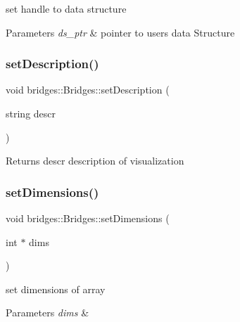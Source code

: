 set handle to data structure


\begin{DoxyParams}{Parameters}
{\em ds\+\_\+ptr} & pointer to user\textquotesingle{}s data Structure \\
\hline
\end{DoxyParams}
\mbox{\label{namespacebridges_1_1_bridges_ada1bced1a3d7af3b8b139bbdfba72fc8}} 
\subsubsection{\texorpdfstring{set\+Description()}{setDescription()}}
{\footnotesize\ttfamily void bridges\+::\+Bridges\+::set\+Description (\begin{DoxyParamCaption}\item[{string}]{descr }\end{DoxyParamCaption})}

\begin{DoxyReturn}{Returns}
descr description of visualization 
\end{DoxyReturn}
\mbox{\label{namespacebridges_1_1_bridges_a0c04930dee803801d3a26c6ef70183f2}} 
\subsubsection{\texorpdfstring{set\+Dimensions()}{setDimensions()}}
{\footnotesize\ttfamily void bridges\+::\+Bridges\+::set\+Dimensions (\begin{DoxyParamCaption}\item[{int $\ast$}]{dims }\end{DoxyParamCaption})}

set dimensions of array


\begin{DoxyParams}{Parameters}
{\em dims} & \\
\hline
\end{DoxyParams}
\mbox{\label{namespacebridges_1_1_bridges_a569953bfdb1c2a29dbd0f7d6dee73606}} 

